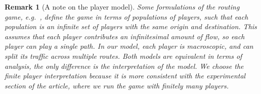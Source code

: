 \documentclass{sig-alternate-ipsn13}
\newtheorem{remark}{Remark}
\begin{document}
\begin{remark}[A note on the player model] Some formulations of the routing game, e.g.~\cite{sandholm2001potential,krichene2015learning}, define the game in terms of \emph{populations} of players, such that each population is an infinite set of players with the same origin and destination. This assumes that each player contributes an infinitesimal amount of flow, so each player can play a single path. In our model, each player is macroscopic, and can split its traffic across multiple routes. Both models are equivalent in terms of analysis, the only difference is the interpretation of the model. We choose the finite player interpretation because it is more consistent with the experimental section of the article, where we run the game with finitely many players.
\end{remark}
\end{document}
